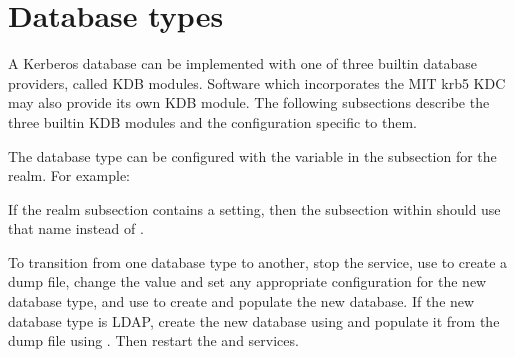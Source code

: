 \documentclass[letterpaper,10pt,english]{sphinxmanual}
\begin{document}
\chapter{Database types}
\label{\detokenize{admin/dbtypes:database-types}}\label{\detokenize{admin/dbtypes:dbtypes}}\label{\detokenize{admin/dbtypes::doc}}
\sphinxAtStartPar
A Kerberos database can be implemented with one of three built\sphinxhyphen{}in
database providers, called KDB modules.  Software which incorporates
the MIT krb5 KDC may also provide its own KDB module.  The following
subsections describe the three built\sphinxhyphen{}in KDB modules and the
configuration specific to them.

\sphinxAtStartPar
The database type can be configured with the  variable
in the {\hyperref[\detokenize{admin/conf_files/kdc_conf:dbmodules}]{}} subsection for the realm.  For example:

\begin{sphinxVerbatim}[commandchars=\\\{\}]
\PYG{p}{[}\PYG{p}{]}
      
          
\end{sphinxVerbatim}

\sphinxAtStartPar
If the  realm subsection contains a
 setting, then the subsection within
\sphinxcode{\sphinxupquote{{[}dbmodules{]}}} should use that name instead of .

\sphinxAtStartPar
To transition from one database type to another, stop the
{\hyperref[\detokenize{admin/admin_commands/kadmind:kadmind-8}]{}} service, use  to create a dump
file, change the  value and set any appropriate
configuration for the new database type, and use  to
create and populate the new database.  If the new database type is
LDAP, create the new database using  and populate it
from the dump file using .  Then restart the
{\hyperref[\detokenize{admin/admin_commands/krb5kdc:krb5kdc-8}]{}} and {\hyperref[\detokenize{admin/admin_commands/kadmind:kadmind-8}]{}} services.
\end{document}
